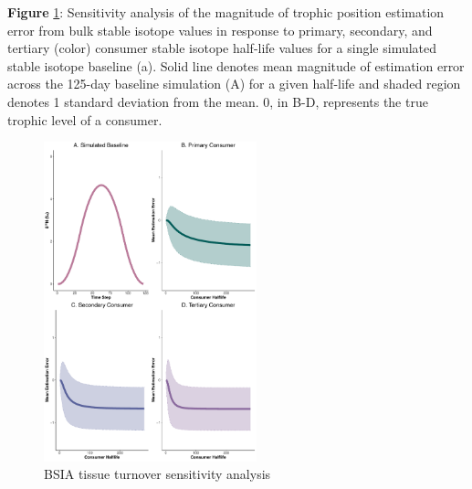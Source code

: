 \documentclass [11pt, proquest] {uwthesis}[2015/03/03]
\begin{document}
\textbf{Figure} \ref{fig:SensBSIA}: Sensitivity analysis of the
magnitude of trophic position estimation error from bulk stable isotope
values in response to primary, secondary, and tertiary (color) consumer
stable isotope half-life values for a single simulated stable isotope
baseline (a). Solid line denotes mean magnitude of estimation error
across the 125-day baseline simulation (A) for a given half-life and
shaded region denotes 1 standard deviation from the mean. 0, in B-D,
represents the true trophic level of a consumer. \newline 
\begin{figure}[h]
\centering
  \includegraphics[width=0.55\textwidth]{figure/Ch5/Figure8.pdf}
  \caption{BSIA tissue turnover sensitivity analysis}
  \label{fig:SensBSIA}
\end{figure}
\clearpage
\end{document}
